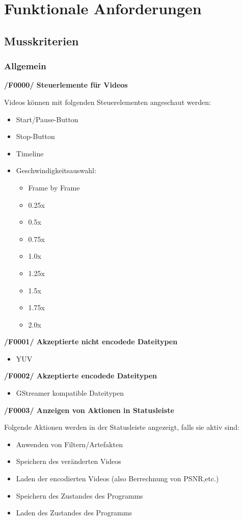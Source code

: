 \documentclass[parskip=full]{scrartcl}
\begin{document}
\section{Funktionale Anforderungen}
\subsection{Musskriterien}
\subsubsection{Allgemein}
\textbf{/F0000/ Steuerlemente für Videos}

Videos können mit folgenden Steuerelementen angeschaut werden:
\begin{itemize}
\item Start/Pause-Button
\item Stop-Button
\item Timeline
\item Geschwindigkeitsauswahl:
\begin{itemize}
\item Frame by Frame
\item 0.25x
\item 0.5x
\item 0.75x
\item 1.0x
\item 1.25x
\item 1.5x
\item 1.75x
\item 2.0x
\end{itemize}
\end{itemize}

\textbf{/F0001/ Akzeptierte nicht encodede Dateitypen}

\begin{itemize}
\item YUV
\end{itemize}
\newpage
\textbf{/F0002/ Akzeptierte encodede Dateitypen}
\begin{itemize}
\item GStreamer kompatible Dateitypen
\end{itemize}

\textbf{/F0003/ Anzeigen von Aktionen in Statusleiste}

Folgende Aktionen werden in der Statusleiste angezeigt, falls sie aktiv sind:
\begin{itemize}
\item Anwenden von Filtern/Artefakten
\item Speichern des veränderten Videos
\item Laden der encodierten Videos (also Berrechnung von PSNR,etc.)
\item Speichern des Zustandes des Programms
\item Laden des Zustandes des Programms
\end{itemize}
\end{document}
